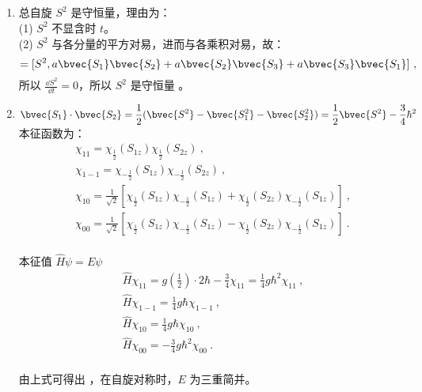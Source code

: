 \subsection{ }
\begin{enumerate}
\item 总自旋 $S^2$ 是守恒量，理由为：\\
(1) $S^2$ 不显含时 $t$。\\
(2) $S^2$ 与各分量的平方对易，进而与各乘积对易，故：\\
\begin{equation}
[S^2 ,H^2] = [S^2 , a \bvec{S_1} \bvec{S_2} + a \bvec{S_2} \bvec{S_3} + a \bvec{S_3} \bvec{S_1}]~,
\end{equation}
所以 $\frac{\dd{S^2}}{\dd{t}}=0$，所以 $S^2$ 是守恒量 。

\item $\displaystyle \bvec{S_1} \cdot \bvec{S_2} = \frac{1}{2} (\bvec{S^2} -\bvec{S^2_1} -\bvec{S^2_2}) = \frac{1}{2} \bvec{S^2} - \frac{3}{4} \hbar^2 $ \\

本征函数为：\\
\begin{equation}
\begin{aligned}
& \chi_{11} = \chi_{\frac{1}{2}}(S_{1z})\chi_{\frac{1}{2}}(S_{2z})~, \\
& \chi_{1-1} = \chi_{-\frac{1}{2}}(S_{1z})\chi_{-\frac{1}{2}}(S_{2z}) ~,\\
& \chi_{10} = \frac{1}{\sqrt{2}} \left[ \chi_{\frac{1}{2}}(S_{1z})\chi_{-\frac{1}{2}}(S_{1z}) + \chi_{\frac{1}{2}}(S_{2z})\chi_{-\frac{1}{2}}(S_{1z}) \right]~, \\
& \chi_{00} = \frac{1}{\sqrt{2}} \left[ \chi_{\frac{1}{2}}(S_{1z})\chi_{-\frac{1}{2}}(S_{1z}) - \chi_{\frac{1}{2}}(S_{2z})\chi_{-\frac{1}{2}}(S_{1z}) \right] ~. \\
\end{aligned}
\end{equation}

本征值 $\hat{H}\psi = E\psi $ \\
\begin{equation}
\begin{aligned}
& \hat{H}\chi_{11} = g(\frac{1}{2}) \cdot 2\hbar - \frac{3}{4} \chi_{11} = \frac{1}{4}g\hbar^{2} \chi_{11}~,  \\
& \hat{H}\chi_{1-1} = \frac{1}{4}g\hbar \chi_{1-1} ~, \\
& \hat{H}\chi_{10} = \frac{1}{4}g\hbar \chi_{10} ~, \\
& \hat{H}\chi_{00} = -\frac{3}{4}g\hbar^{2} \chi_{00}  ~.\\
\end{aligned}
\end{equation}

由上式可得出 ，在自旋对称时，$E$ 为三重简并。
\end{enumerate}